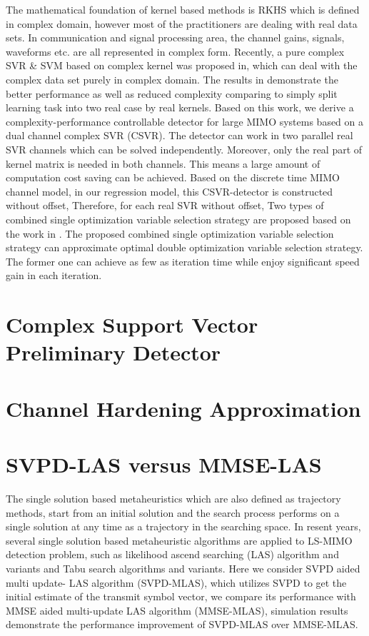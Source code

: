 The mathematical foundation of kernel based methods is RKHS which is defined in complex domain, however most of the practitioners are dealing with real data sets. In communication and signal processing area, the channel gains, signals, waveforms etc. are all represented in complex form. Recently, a pure complex SVR \& SVM based on complex kernel was proposed in\cite{bouboulis2013complex}, which can deal with the complex data set purely in complex domain. The results in\cite{bouboulis2013complex} demonstrate the better performance as well as reduced complexity comparing to simply split learning task into two real case by real kernels.  
Based on this work, we derive a complexity-performance controllable detector for large MIMO systems based on a dual channel complex SVR (CSVR). The detector can work in two parallel real SVR channels which can be solved independently. Moreover, only the real part of kernel matrix is needed in both channels. This means a large amount of computation cost saving can be achieved.
Based on the discrete time MIMO channel model, in our regression model, this CSVR-detector
is constructed without offset, Therefore, for each real SVR without offset, 
Two types of combined single optimization variable selection strategy are proposed based on the work in \cite{steinwart2011training}. The proposed combined single optimization variable selection strategy can approximate optimal double optimization variable selection strategy. The former one can achieve as few as iteration time while enjoy significant speed gain in each iteration.
\section{Complex Support Vector Preliminary Detector}
\section{Channel Hardening Approximation}
\section{SVPD-LAS versus MMSE-LAS}
The single solution based metaheuristics which are also defined as trajectory methods, start from an initial solution and the search process performs on a single solution at any time as a trajectory in the searching space. In resent years, several single solution based metaheuristic algorithms are applied to LS-MIMO detection problem, such as likelihood ascend searching (LAS) algorithm and variants\cite{vardhan2008low}\cite{cerato2009hardware}\cite{li2010multiple} and Tabu search algorithms and variants\cite{srinidhi2011layered}\cite{datta2010random}. Here we consider SVPD aided multi update- LAS algorithm (SVPD-MLAS), which utilizes SVPD to get the initial estimate of the transmit symbol vector, we compare its performance with MMSE aided multi-update LAS algorithm (MMSE-MLAS), simulation results demonstrate the performance improvement of SVPD-MLAS over MMSE-MLAS.
